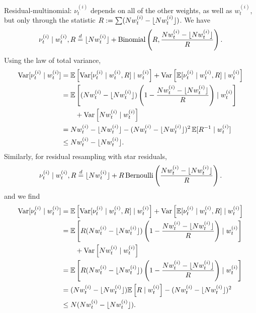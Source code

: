 Residual-multinomial: $\nu_t^{(i)}$ depends on all of the other weights, as well as $w_t^{(i)}$, but only through the statistic $R := \sum (N w_t^{(i)} - \lfloor N w_t^{(i)} \rfloor)$.
We have
\begin{equation*}
\nu_t^{(i)} \mid w_t^{(i)} , R
\overset{d}{=} \lfloor N w_t^{(i)} \rfloor + \operatorname{Binomial}\left( R, \frac{Nw_t^{(i)} - \lfloor N w_t^{(i)} \rfloor}{R} \right) .
\end{equation*}
Using the law of total variance,
\begin{align*}
\operatorname{Var}[ \nu_t^{(i)} \mid w_t^{(i)} ]
&= \mathbb{E}\left[ \operatorname{Var}[ \nu_t^{(i)} \mid w_t^{(i)}, R ] \mid w_t^{(i)} \right]
        + \operatorname{Var}\left[ \mathbb{E}[ \nu_t^{(i)} \mid w_t^{(i)}, R ] \mid w_t^{(i)} \right] \\
&= \mathbb{E}\left[ (Nw_t^{(i)} - \lfloor N w_t^{(i)} \rfloor) \left( 1- \frac{Nw_t^{(i)} - \lfloor N w_t^{(i)} \rfloor}{R} \right) 
        \mid w_t^{(i)} \right] \\
    &\qquad+ \operatorname{Var}\left[ Nw_t^{(i)} \mid w_t^{(i)} \right] \\
&= Nw_t^{(i)} - \lfloor N w_t^{(i)} \rfloor - (Nw_t^{(i)} - \lfloor N w_t^{(i)} \rfloor)^2\, \mathbb{E}[ R^{-1} \mid w_t^{(i)} ] \\
&\leq Nw_t^{(i)} - \lfloor N w_t^{(i)} \rfloor .
\end{align*}
Similarly, for residual resampling with star residuals,
\begin{equation*}
\nu_t^{(i)} \mid w_t^{(i)} , R
\overset{d}{=} \lfloor N w_t^{(i)} \rfloor + R \operatorname{Bernoulli}\left( \frac{Nw_t^{(i)} - \lfloor N w_t^{(i)} \rfloor}{R} \right) .
\end{equation*}
and we find
\begin{align*}
\operatorname{Var}[ \nu_t^{(i)} \mid w_t^{(i)} ]
&= \mathbb{E}\left[ \operatorname{Var}[ \nu_t^{(i)} \mid w_t^{(i)}, R ] \mid w_t^{(i)} \right]
        + \operatorname{Var}\left[ \mathbb{E}[ \nu_t^{(i)} \mid w_t^{(i)}, R ] \mid w_t^{(i)} \right] \\
&= \mathbb{E}\left[ R (Nw_t^{(i)} - \lfloor N w_t^{(i)} \rfloor) \left( 1- \frac{Nw_t^{(i)} - \lfloor N w_t^{(i)} \rfloor}{R} \right) 
        \mid w_t^{(i)} \right] \\
    &\qquad+ \operatorname{Var}\left[ Nw_t^{(i)} \mid w_t^{(i)} \right] \\
&= \mathbb{E}\left[ R (Nw_t^{(i)} - \lfloor N w_t^{(i)} \rfloor) \left( 1- \frac{Nw_t^{(i)} - \lfloor N w_t^{(i)} \rfloor}{R} \right) 
        \mid w_t^{(i)} \right] \\
&= (Nw_t^{(i)} - \lfloor N w_t^{(i)} \rfloor) \mathbb{E}\left[ R \mid w_t^{(i)} \right]  - (Nw_t^{(i)} - \lfloor N w_t^{(i)} \rfloor)^2 \\
&\leq N (Nw_t^{(i)} - \lfloor N w_t^{(i)} \rfloor) .
\end{align*}

